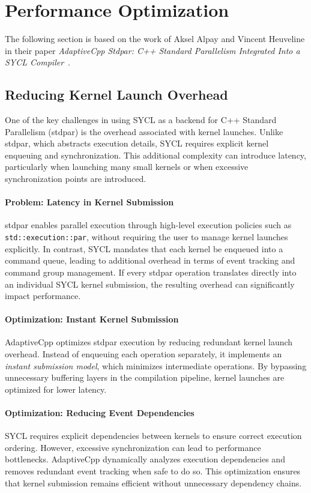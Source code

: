 \section{Performance Optimization}
\label{sec:performance_optimization}

The following section is based on the work of Aksel Alpay and Vincent Heuveline in their paper
\textit{AdaptiveCpp Stdpar: C++ Standard Parallelism Integrated Into a SYCL Compiler}~\cite{alpay2021}.

\subsection{Reducing Kernel Launch Overhead}
\label{sec:kernel_launch_overhead}

One of the key challenges in using SYCL as a backend for C++ Standard Parallelism (stdpar) is the overhead
associated with kernel launches. Unlike stdpar, which abstracts execution details, SYCL requires explicit kernel
enqueuing and synchronization. This additional complexity can introduce latency, particularly when launching
many small kernels or when excessive synchronization points are introduced.

\paragraph{Problem: Latency in Kernel Submission}
stdpar enables parallel execution through high-level execution policies such as \texttt{std::execution::par},
without requiring the user to manage kernel launches explicitly. In contrast, SYCL mandates that each kernel
be enqueued into a command queue, leading to additional overhead in terms of event tracking and command
group management. If every stdpar operation translates directly into an individual SYCL kernel submission,
the resulting overhead can significantly impact performance.

\paragraph{Optimization: Instant Kernel Submission}
AdaptiveCpp optimizes stdpar execution by reducing redundant kernel launch overhead. Instead of enqueuing
each operation separately, it implements an \textit{instant submission model}, which minimizes intermediate
operations. By bypassing unnecessary buffering layers in the compilation pipeline, kernel launches are
optimized for lower latency.

\paragraph{Optimization: Reducing Event Dependencies}
SYCL requires explicit dependencies between kernels to ensure correct execution ordering. However, excessive
synchronization can lead to performance bottlenecks. AdaptiveCpp dynamically analyzes execution dependencies
and removes redundant event tracking when safe to do so. This optimization ensures that kernel submission
remains efficient without unnecessary dependency chains.

